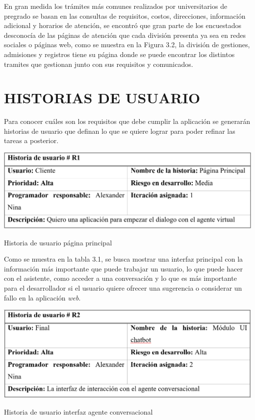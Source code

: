 \documentclass[letter, openright, 12pt]{book}
\begin{document}
\par
En gran medida los trámites más comunes realizados por universitarios de pregrado se basan en las consultas de requisitos, costos, direcciones, información adicional y horarios de atención, se encontró que gran parte de los encuestados desconocía de las páginas de atención que cada división presenta ya sea en redes sociales o páginas web, como se muestra en la Figura 3.2, la división de gestiones, admisiones y registros tiene su página donde se puede encontrar los distintos tramites que gestionan junto con sus requisitos y comunicados. 



\par
\section{HISTORIAS DE USUARIO}
Para conocer cuáles son los requisitos que debe cumplir la aplicación se  generarán historias de usuario que definan lo que se quiere lograr para poder refinar las tareas a posterior. 

\hfill

\begin{table}[!ht]
\includegraphics[width=1\textwidth]{tabla3_1}
\caption{Historia de usuario página principal} 
\label{tab:tabla3_1} 
\end{table}

\par
Como se muestra en la tabla 3.1, se busca mostrar una interfaz principal con la información más importante que puede trabajar un usuario, lo que puede hacer con el asistente, como acceder a una conversación y lo que es más importante para el desarrollador si el usuario quiere ofrecer una sugerencia o considerar un fallo en la aplicación {\it web}.

\begin{table}[!ht]
\includegraphics[width=1\textwidth]{tabla3_2}
\caption{Historia de usuario interfaz agente conversacional} 
\label{tab:tabla3_2} 
\end{table}
\end{document}
